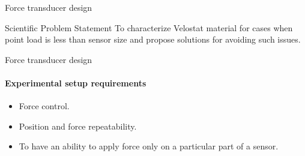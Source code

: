 \documentclass[aspectratio=169]{beamer}
\begin{document}
\begin{frame}[t]{Force transducer design}
\begin{multicols}{2}
\begin{figure}[H]
                \label{fig:velostat_pressure_resistance.jpg}
            \end{figure}
    \end{multicols}
    \vspace{-12pt}
    \begin{block}{Scientific Problem Statement}
        To characterize Velostat material for cases when point load is less than sensor size and propose solutions for avoiding such issues.
    \end{block}
\end{frame}

\begin{frame}[t]{Force transducer design}
    \framesubtitle{Experimental setup requirements}
    \vspace{-0.5cm}
    {\Large
        \begin{itemize}
            \item Force control. 
            \item Position and force repeatability. 
            \item To have an ability to apply force only on a particular part of a sensor. 
        \end{itemize}}
\end{frame}
\end{document}

